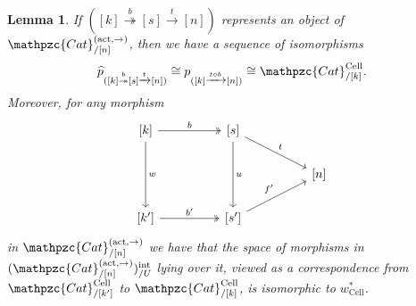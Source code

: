 \documentclass[a4paper, reqno]{amsart}
\newtheorem{lemma}[theorem]{Lemma}
\theoremstyle{definition}
\newcommand\ccat{\mathpzc{Cat}}
\newcommand\cell{\mathrm{Cell}}
\newcommand\act{\mathrm{act}}
\newcommand\inrt{\mathrm{int}}
\begin{document}
\begin{lemma}\label{lem:forget_2}
If $([k]\overset{b}{\twoheadrightarrow}[s]\xrightarrow{t}[n])$ represents an object of $\ccat^{(\act,\rightarrow)}_{/[n]}$, then we have a sequence of isomorphisms
\[\widehat{p}_{([k]\overset{b}{\twoheadrightarrow}[s]\xrightarrow{t}[n])}\cong p_{([k]\xrightarrow{t\circ b}[n])}\cong\ccat^\cell_{/[k]}.\]
Moreover, for any morphism
\[
\begin{tikzcd}[column sep=huge]
{[k]}\arrow[dd, "w"]\arrow[r,two heads, "b"]&{[s]}\arrow[dd, "u"]\arrow[dr, "t"]\\
{}&{}&{[n]}\\
{[k']}\arrow[r, two heads, "b'"]&{[s']}\arrow[ur, "f'"]
\end{tikzcd}
\]
in $\ccat^{(\act,\rightarrow)}_{/[n]}$ we have that the space of morphisms in $(\ccat^{(\act,\rightarrow)}_{/[n]})^\inrt_{/U}$ lying over it, viewed as a correspondence from $\ccat^\cell_{/[k']}$ to $\ccat^\cell_{/[k]}$, is isomorphic to $w^*_\cell$.
\end{lemma}
\end{document}
